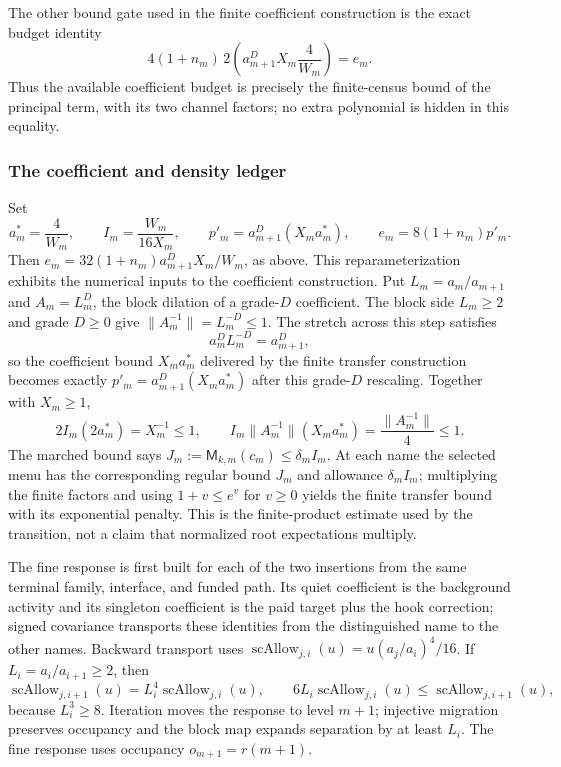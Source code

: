 The other bound gate used in the finite coefficient construction is the exact budget
identity
\begin{equation}\label{eq:ex-lattice-shell-ledger-budget}
 4(1+n_m)\,2\left(a_{m+1}^{D}X_m\frac{4}{W_m}\right)=e_m.
\end{equation}
Thus the available coefficient budget is precisely the finite-census
bound of the principal term, with its two channel factors; no extra
polynomial is hidden in this equality.

\subsubsection{The coefficient and density ledger}

Set
\begin{equation}\label{eq:ex-lattice-shell-one-step-scales}
 a_m^*=\frac4{W_m},\qquad I_m=\frac{W_m}{16X_m},\qquad
 p'_m=a_{m+1}^{D}(X_m a_m^*),\qquad e_m=8(1+n_m)p'_m.
\end{equation}
Then $e_m=32(1+n_m)a_{m+1}^D X_m/W_m$, as above. This reparameterization
exhibits the numerical inputs to the coefficient construction. Put
$L_m=a_m/a_{m+1}$ and $A_m=L_m^D$, the block dilation of a grade-$D$
coefficient. The block
side $L_m\geq2$ and grade $D\geq0$ give $\|A_m^{-1}\|=L_m^{-D}\leq1$.
The stretch across this step satisfies
\[
 a_m^D L_m^{-D}=a_{m+1}^D,
\]
so the coefficient bound $X_m a_m^*$ delivered by the finite transfer
construction becomes exactly $p'_m=a_{m+1}^D(X_m a_m^*)$ after this
grade-$D$ rescaling.
Together with $X_m\geq1$,
\[
 2I_m(2a_m^*)=X_m^{-1}\leq1,\qquad
 I_m\|A_m^{-1}\|(X_ma_m^*)=\frac{\|A_m^{-1}\|}{4}\leq1.
\]
The marched bound says $J_m:=\mathsf M_{k,m}(c_m)\leq\delta_m I_m$.
At each name the selected menu has the corresponding regular bound
$J_m$ and allowance $\delta_m I_m$; multiplying the finite factors and
using $1+v\leq e^v$ for $v\geq0$ yields the finite transfer bound
with its exponential penalty. This is the
finite-product estimate used by the transition, not a claim that normalized
root expectations multiply.

The fine response is first built for each of the two
insertions from the same terminal family, interface, and funded path. Its quiet
coefficient is the background activity and its singleton coefficient is
the paid target plus the hook correction; signed covariance transports
these identities from the distinguished name to the other names. Backward
transport uses
$\operatorname{scAllow}_{j,i}(u)=u(a_j/a_i)^4/16$. If
$L_i=a_i/a_{i+1}\geq2$, then
\[
 \operatorname{scAllow}_{j,i+1}(u)=L_i^4\operatorname{scAllow}_{j,i}(u),
 \qquad 6L_i\operatorname{scAllow}_{j,i}(u)
       \leq\operatorname{scAllow}_{j,i+1}(u),
\]
because $L_i^3\geq8$. Iteration moves the response to level $m+1$;
injective migration preserves occupancy and the block map expands
separation by at least $L_i$. The fine response uses occupancy
$o_{m+1}=r(m+1)$.

